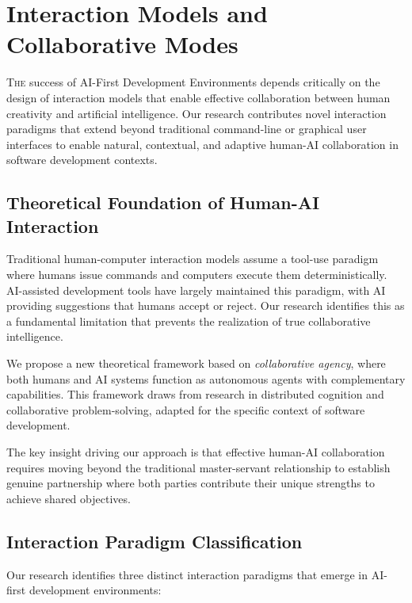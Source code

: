 
\section{Interaction Models and Collaborative Modes}
\label{sec:interaction-models}

\vspace{0.5cm}
\lettrine{T}{he} success of AI-First Development Environments depends critically on the design of interaction models that enable effective collaboration between human creativity and artificial intelligence. Our research contributes novel interaction paradigms that extend beyond traditional command-line or graphical user interfaces to enable natural, contextual, and adaptive human-AI collaboration in software development contexts.

\subsection{Theoretical Foundation of Human-AI Interaction}

Traditional human-computer interaction models assume a tool-use paradigm where humans issue commands and computers execute them deterministically. AI-assisted development tools have largely maintained this paradigm, with AI providing suggestions that humans accept or reject. Our research identifies this as a fundamental limitation that prevents the realization of true collaborative intelligence.

We propose a new theoretical framework based on \textit{collaborative agency}, where both humans and AI systems function as autonomous agents with complementary capabilities. This framework draws from research in distributed cognition and collaborative problem-solving, adapted for the specific context of software development.

The key insight driving our approach is that effective human-AI collaboration requires moving beyond the traditional master-servant relationship to establish genuine partnership where both parties contribute their unique strengths to achieve shared objectives.

\subsection{Interaction Paradigm Classification}

Our research identifies three distinct interaction paradigms that emerge in AI-first development environments:

